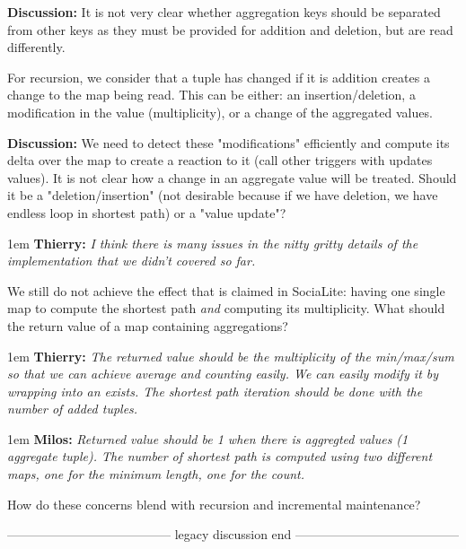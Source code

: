 \documentclass[11pt]{article}
\newlength{\dlen}
\def\discuss#1{\par\hspace{2em}
\setlength{\dlen}{\textwidth}
\addtolength{\dlen}{-2em}
\begin{minipage}{\dlen}\footnotesize {\bf\color{red} Discussion:} #1\end{minipage}\par}
\def\say#1#2{\begingroup\par\leftskip1em {\bf #1:} \it #2\par\endgroup}
\begin{document}
\discuss{It is not very clear whether aggregation keys should be separated from other keys as they must be provided for addition and deletion, but are read differently.}
For recursion, we consider that a tuple has changed if it is addition creates a change to the map being read. This can be either: an insertion/deletion, a modification in the value (multiplicity), or a change of the aggregated values.
\discuss{We need to detect these "modifications" efficiently and compute its delta over the map to create a reaction to it (call other triggers with updates values). It is not clear how a change in an aggregate value will be treated. Should it be a "deletion/insertion" (not desirable because if we have deletion, we have endless loop in shortest path) or a "value update"?
	\say{Thierry}{I think there is many issues in the nitty gritty details of the implementation that we didn't covered so far.}
We still do not achieve the effect that is claimed in SociaLite: having one single map to compute the shortest path \textit{and} computing its multiplicity. What should the return value of a map containing aggregations?
	\say{Thierry}{The returned value should be the multiplicity of the min/max/sum so that we can achieve average and counting easily. We can easily modify it by wrapping into an exists. The shortest path iteration should be done with the number of added tuples.}
	\say{Milos}{Returned value should be 1 when there is aggregted values (1 aggregate tuple). The number of shortest path is computed using two different maps, one for the minimum length, one for the count.}
}
How do these concerns blend with recursion and incremental maintenance?

{\center --------------------------------------- legacy discussion end ---------------------------------------}
\end{document}
